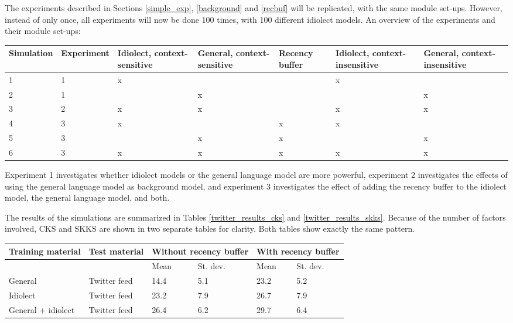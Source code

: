 \documentclass[11pt]{article}
\let\originaltable\table
\let\endoriginaltable\endtable
\renewenvironment{table}[1][ht]{%
  \originaltable[#1]
  \centering}%
  {\endoriginaltable}
\begin{document}
The experiments described in Sections \ref{simple_exp}, \ref{background} and \ref{recbuf} will be replicated, with the same module set-ups. However, instead of only once, all experiments will now be done 100 times, with 100 different idiolect models. An overview of the experiments and their module set-ups:


\begin{table}[H] \footnotesize
\begin{tabular}{l|l|p{1.2cm}p{1.2cm}p{1.2cm}p{1.2cm}p{1.2cm}} 
Simulation&Experiment&Idiolect, context-sensitive&General, context-sensitive&Recency buffer&Idiolect, context-insensitive&General, context-insensitive\\
\hline
1&1&x&&&x&\\
2&1&&x&&&x\\

3&2&x&x&&x&x\\

4&3&x&&x&x&\\
5&3&&x&x&&x\\
6&3&x&x&x&x&x\\

\end{tabular} 
\caption{Overview of all module set-ups} 
\end{table}

Experiment 1 investigates whether idiolect models or the general language model are more powerful, experiment 2 investigates the effects of using the general language model as background model, and experiment 3 investigates the effect of adding the recency buffer to the idiolect model, the general language model, and both.

The results of the simulations are summarized in Tables \ref{twitter_results_cks} and \ref{twitter_results_skks}. Because of the number of factors involved, CKS and SKKS are shown in two separate tables for clarity. Both tables show exactly the same pattern.

\begin{table}[H] 
\centering
\begin{tabular}{ll|llll} 
Training material&Test material&\multicolumn{2}{l}{Without recency buffer}&\multicolumn{2}{l}{With recency buffer}\\
\hline
&&Mean&St. dev.&Mean&St. dev.\\
General&Twitter feed&14.4&5.1&23.2&5.2\\
Idiolect&Twitter feed&23.2&7.9&26.7&7.9\\
General + idiolect&Twitter feed&26.4&6.2&29.7&6.4\\
\end{tabular} 
\caption{Mean percentage of keystrokes saved (\textbf{CKS}) and standard deviations for all module set-ups.} \label{twitter_results_cks}
\end{table}
\end{document}
